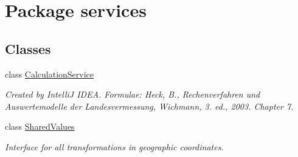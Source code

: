 \hypertarget{namespaceservices}{}\section{Package services}
\label{namespaceservices}
\subsection*{Classes}
\begin{DoxyCompactItemize}
\item 
class \hyperlink{classservices_1_1_calculation_service}{Calculation\+Service}
\begin{DoxyCompactList}\small\item\em Created by IntelliJ I\+D\+EA. Formulae\+: Heck, B., Rechenverfahren und Auswertemodelle der Landesvermessung, Wichmann, 3. ed., 2003. Chapter 7. \end{DoxyCompactList}\item 
class \hyperlink{interfaceservices_1_1_shared_values}{Shared\+Values}
\begin{DoxyCompactList}\small\item\em Interface for all transformations in geographic coordinates. \end{DoxyCompactList}\end{DoxyCompactItemize}
